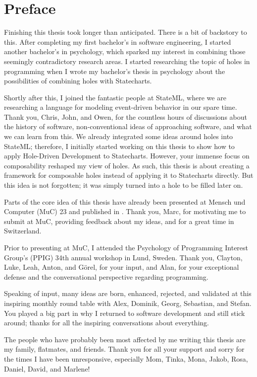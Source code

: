 \chapter{Preface}
Finishing this thesis took longer than anticipated.
There is a bit of backstory to this.
After completing my first bachelor's in software engineering, I started another bachelor's in psychology, which sparked my interest in combining those seemingly contradictory research areas.
I started researching the topic of holes in programming when I wrote my bachelor's thesis in psychology about the possibilities of combining holes with Statecharts.

Shortly after this, I joined the fantastic people at StateML, where we are researching a language for modeling event-driven behavior in our spare time.
Thank you, Chris, John, and Owen, for the countless hours of discussions about the history of software, non-conventional ideas of approaching software, and what we can learn from this.
We already integrated some ideas around holes into StateML; therefore, I initially started working on this thesis to show how to apply Hole-Driven Development to Statecharts.
However, your immense focus on composability reshaped my view of holes.
As such, this thesis is about creating a framework for composable holes instead of applying it to Statecharts directly.
But this idea is not forgotten; it was simply turned into a hole to be filled later on.

Parts of the core idea of this thesis have already been presented at Mensch und Computer (MuC) 23 and published in \cite{mayr_replacing_2023}.
Thank you, Marc, for motivating me to submit at MuC, providing feedback about my ideas, and for a great time in Switzerland.

Prior to presenting at MuC, I attended the Psychology of Programming Interest Group's (PPIG) 34th annual workshop in Lund, Sweden.
Thank you, Clayton, Luke, Leah, Anton, and Görel, for your input, and Alan, for your exceptional defense and the conversational perspective regarding programming.

Speaking of input, many ideas are born, enhanced, rejected, and validated at this inspiring monthly round table with Alex, Dominik, Georg, Sebastian, and Stefan.
You played a big part in why I returned to software development and still stick around; thanks for all the inspiring conversations about everything.

The people who have probably been most affected by me writing this thesis are my family, flatmates, and friends.
Thank you for all your support and sorry for the times I have been unresponsive, especially Mom, Tinka, Mona, Jakob, Rosa, Daniel, David, and Marlene!

